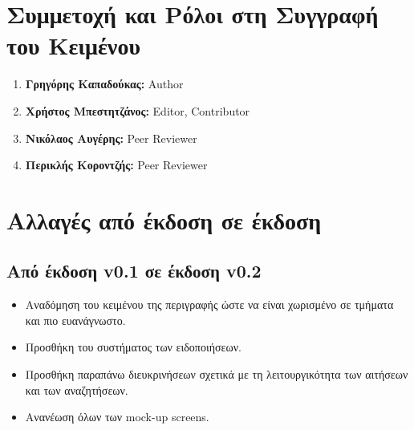 \documentclass[12pt,a4paper]{article}
\begin{document}
\section{Συμμετοχή και Ρόλοι στη Συγγραφή του Κειμένου}

\begin{enumerate}
	\item \textbf{Γρηγόρης Καπαδούκας:} Author
	\item \textbf{Χρήστος Μπεστητζάνος:} Editor, Contributor
	\item \textbf{Νικόλαος Αυγέρης:} Peer Reviewer
	\item \textbf{Περικλής Κοροντζής:} Peer Reviewer
\end{enumerate}

\section{Αλλαγές από έκδοση σε έκδοση}

\subsection{Από έκδοση v0.1 σε έκδοση v0.2}
\begin{itemize}
    \item Αναδόμηση του κειμένου της περιγραφής ώστε να είναι χωρισμένο σε τμήματα και πιο ευανάγνωστο. 
    \item Προσθήκη του συστήματος των ειδοποιήσεων.
    \item Προσθήκη παραπάνω διευκρινήσεων σχετικά με τη λειτουργικότητα των αιτήσεων και των αναζητήσεων.
    \item Ανανέωση όλων των mock-up screens.
\end{itemize}
\end{document}
